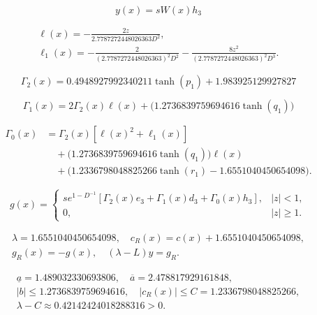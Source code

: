 \begin{equation}\label{eq:ex1-solution}
y(x)=sW(x)h_{3}
\end{equation}


\begin{equation}
\begin{aligned}\ell(x)=-\frac{2z}{2.7787272448026363D^2},\\\ell_1(x)=-\frac{2}{(2.7787272448026363)^2D^2}-\frac{8z^2}{(2.7787272448026363)^2D^3}.\end{aligned}
\end{equation}


\begin{equation}
\Gamma_2(x)=0.4948927992340211 \tanh{\left(p_{1} \right)} + 1.983925129927827
\end{equation}


\begin{equation}
\Gamma_1(x)=2\Gamma_2(x)\ell(x)+\bigl(1.2736839759694616 \tanh{\left(q_{1} \right)}\bigr)
\end{equation}


\begin{equation}
\begin{aligned}\Gamma_0(x)&=\Gamma_2(x)[\ell(x)^2+\ell_1(x)]\\&\quad+\bigl(1.2736839759694616 \tanh{\left(q_{1} \right)}\bigr)\ell(x)\\&\quad+\bigl(1.2336798048825266 \tanh{\left(r_{1} \right)} - 1.6551040450654098\bigr).\end{aligned}
\end{equation}


\begin{equation}\label{eq:ex1-forcing}
g(x)=\begin{cases}s e^{1-D^{-1}}[\Gamma_2(x)e_{3}+\Gamma_1(x)d_{3}+\Gamma_0(x)h_{3}],&|z|<1,\\0,&|z|\ge1.\end{cases}
\end{equation}


\begin{equation}
\begin{aligned}\lambda=1.6551040450654098,\quad c_R(x)=c(x)+1.6551040450654098,\\g_R(x)=-g(x),\quad (\lambda-L)y=g_R.\end{aligned}
\end{equation}


\begin{equation}
\begin{aligned}\underline a=1.489032330693806,\quad \overline a=2.478817929161848,\\|b|\le1.2736839759694616,\quad |c_R(x)|\le C=1.2336798048825266,\\\lambda-C\approx0.42142424018288316>0.\end{aligned}
\end{equation}


